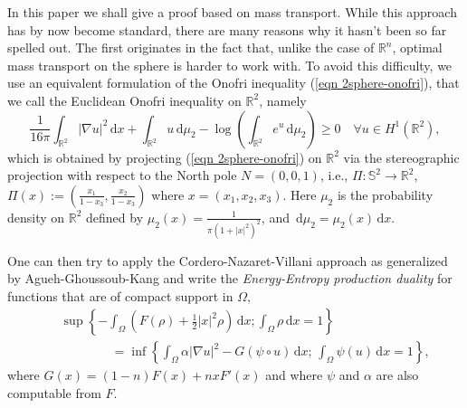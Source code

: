 \documentclass[10pt]{article}
\numberwithin{equation}{section}
\theoremstyle{plain}
\theoremstyle{definition}
\theoremstyle{remark}
\newcommand\R{{\mathbb R}}
\newcommand\s{{\mathbb S}}
\newcommand\dd{\,\mbox{d} }
\begin{document}
In this paper we shall give a proof based on mass transport. While this approach has by now become standard, there are many reasons why it hasn't been so far spelled out. The first originates in the fact that, unlike the case of $\R^n$,  optimal mass transport on the sphere is harder to work with. To avoid this difficulty, we use an equivalent formulation of the Onofri inequality (\ref{eqn 2sphere-onofri}), that we call  the Euclidean Onofri inequality on $\R^2$, namely
\begin{equation}\label{eqn 2euclidean-onofri}
\frac{1}{16\pi}\int_{\R^2} |\nabla u|^2\dd x  + \int_{\R^2} u\dd\mu_2 -\log\left(\int_{\R^2} e^u\dd\mu_2\right) \geq 0  \quad \forall u\in H^1(\R^2),
\end{equation}
which is obtained by projecting (\ref{eqn 2sphere-onofri}) on $\R^2$ via the stereographic projection with respect to the North pole $N=(0,0,1)$, i.e., $\Pi: \s^2 \rightarrow \R^2$, $\Pi(x):=\left(\frac{x_1}{1-x_3}, \frac{x_2}{1-x_3}\right)$ where $x=(x_1,x_2,x_3)$. Here $\mu_2$ is the probability density on $\R^2$ defined by $\mu_2(x)=\frac{1}{\pi(1+|x|^2)^2}$, and $\dd\mu_2 = \mu_2(x)\dd x$.

One can then try to apply the Cordero-Nazaret-Villani \cite{CNV} approach as generalized by Agueh-Ghoussoub-Kang \cite{AGK} and write the {\it Energy-Entropy production duality} for functions that are of compact support in $\Omega$, 
 \begin{eqnarray}
&&\sup\left\{- \int_{\Omega}(F(\rho) + \frac{1}{2}|x|^2\rho) \dd x; \int_\Omega \rho \dd x=1\right\}\\
&& \qquad \qquad=\inf\left\{\int_{\Omega} \alpha|\nabla u|^2
-G\left(\psi\circ u\right) \dd x; \, \int_\Omega\psi(u) \dd x=1\right\},\nonumber
\end{eqnarray}
where $G(x)=(1-n)F(x)+nxF'(x)$ and where $\psi$ and $\alpha$ are also computable from $F$.  
\end{document}
